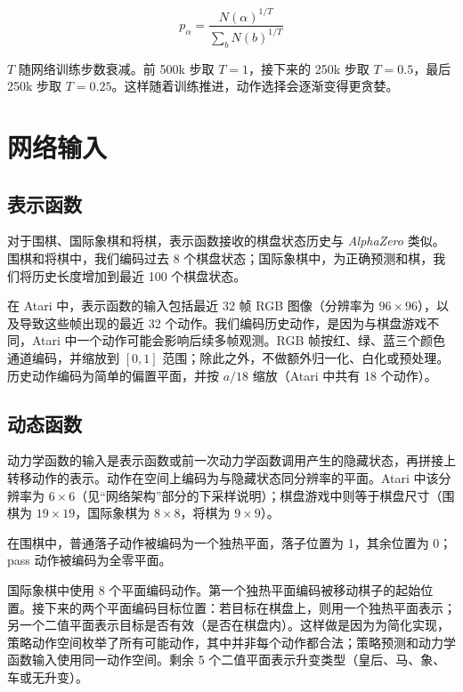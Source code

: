 \documentclass{article}
\newcommand{\alphazero}{\emph{AlphaZero}}
\begin{document}
\begin{appendices}
\begin{equation}
p_{\alpha} = \frac{N(\alpha)^{1 / T}}{\sum_{b} N(b)^{1 / T}}
\end{equation}

$T$ 随网络训练步数衰减。前 500k 步取 $T=1$，接下来的 250k 步取 $T=0.5$，最后 250k 步取 $T=0.25$。这样随着训练推进，动作选择会逐渐变得更贪婪。

\section{网络输入}

\subsection*{表示函数}

对于围棋、国际象棋和将棋，表示函数接收的棋盘状态历史与 \alphazero{}\cite{Silver18AZ} 类似。围棋和将棋中，我们编码过去 8 个棋盘状态；国际象棋中，为正确预测和棋，我们将历史长度增加到最近 100 个棋盘状态。

在 Atari 中，表示函数的输入包括最近 32 帧 RGB 图像（分辨率为 $96 \times 96$），以及导致这些帧出现的最近 32 个动作。我们编码历史动作，是因为与棋盘游戏不同，Atari 中一个动作可能会影响后续多帧观测。RGB 帧按红、绿、蓝三个颜色通道编码，并缩放到 $[0, 1]$ 范围；除此之外，不做额外归一化、白化或预处理。历史动作编码为简单的偏置平面，并按 $a / 18$ 缩放（Atari 中共有 18 个动作）。

\subsection*{动态函数}

动力学函数的输入是表示函数或前一次动力学函数调用产生的隐藏状态，再拼接上转移动作的表示。动作在空间上编码为与隐藏状态同分辨率的平面。Atari 中该分辨率为 $6 \times 6$（见“网络架构”部分的下采样说明）；棋盘游戏中则等于棋盘尺寸（围棋为 $19 \times 19$，国际象棋为 $8 \times 8$，将棋为 $9 \times 9$）。

在围棋中，普通落子动作被编码为一个独热平面，落子位置为 1，其余位置为 0；pass 动作被编码为全零平面。

国际象棋中使用 8 个平面编码动作。第一个独热平面编码被移动棋子的起始位置。接下来的两个平面编码目标位置：若目标在棋盘上，则用一个独热平面表示；另一个二值平面表示目标是否有效（是否在棋盘内）。这样做是因为为简化实现，策略动作空间枚举了所有可能动作，其中并非每个动作都合法；策略预测和动力学函数输入使用同一动作空间。剩余 5 个二值平面表示升变类型（皇后、马、象、车或无升变）。


\end{appendices}
\end{document}

